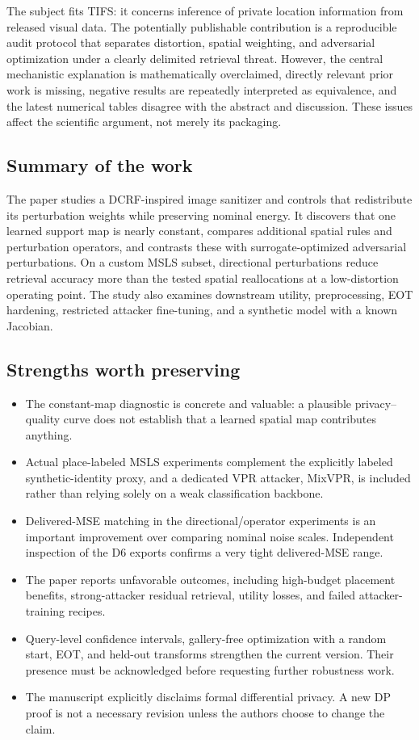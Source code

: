 \documentclass[11pt,a4paper]{article}
\begin{document}
The subject fits TIFS: it concerns inference of private location information from released visual data. The potentially publishable contribution is a reproducible audit protocol that separates distortion, spatial weighting, and adversarial optimization under a clearly delimited retrieval threat. However, the central mechanistic explanation is mathematically overclaimed, directly relevant prior work is missing, negative results are repeatedly interpreted as equivalence, and the latest numerical tables disagree with the abstract and discussion. These issues affect the scientific argument, not merely its packaging.

\subsection{Summary of the work}
The paper studies a DCRF-inspired image sanitizer and controls that redistribute its perturbation weights while preserving nominal energy. It discovers that one learned support map is nearly constant, compares additional spatial rules and perturbation operators, and contrasts these with surrogate-optimized adversarial perturbations. On a custom MSLS subset, directional perturbations reduce retrieval accuracy more than the tested spatial reallocations at a low-distortion operating point. The study also examines downstream utility, preprocessing, EOT hardening, restricted attacker fine-tuning, and a synthetic model with a known Jacobian.

\subsection{Strengths worth preserving}
\begin{itemize}
\item The constant-map diagnostic is concrete and valuable: a plausible privacy--quality curve does not establish that a learned spatial map contributes anything.
\item Actual place-labeled MSLS experiments complement the explicitly labeled synthetic-identity proxy, and a dedicated VPR attacker, MixVPR, is included rather than relying solely on a weak classification backbone.
\item Delivered-MSE matching in the directional/operator experiments is an important improvement over comparing nominal noise scales. Independent inspection of the D6 exports confirms a very tight delivered-MSE range.
\item The paper reports unfavorable outcomes, including high-budget placement benefits, strong-attacker residual retrieval, utility losses, and failed attacker-training recipes.
\item Query-level confidence intervals, gallery-free optimization with a random start, EOT, and held-out transforms strengthen the current version. Their presence must be acknowledged before requesting further robustness work.
\item The manuscript explicitly disclaims formal differential privacy. A new DP proof is not a necessary revision unless the authors choose to change the claim.
\end{itemize}
\end{document}
